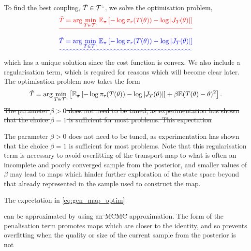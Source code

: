 \documentclass[final]{siamltex}
\newcommand{\edit}[1]{{\color{red} #1}}  %
\newcommand{\ltri}{%
\,\resizebox{!}{0.25\baselineskip}{%
\begin{tikzpicture}%
\draw[line width=1mm](0,0) -- (0,2) -- (2,0)  -- (0,0);
\end{tikzpicture}%
}\xspace%
}%
\newcommand{\smallltri}{%
\,\resizebox{!}{0.15\baselineskip}{%
\begin{tikzpicture}%
\draw[line width=1mm](0,0) -- (0,2) -- (2,0)  -- (0,0);
\end{tikzpicture}%
}\xspace%
}%
\providecommand{\DIFadd}[1]{{\protect\color{blue}\uwave{#1}}} %
\providecommand{\DIFdel}[1]{{\protect\color{red}\sout{#1}}}                      %
\providecommand{\DIFaddbegin}{} %
\providecommand{\DIFaddend}{} %
\providecommand{\DIFdelbegin}{} %
\providecommand{\DIFdelend}{} %
\newcommand{\DIFscaledelfig}{0.5}
\newlength{\DIFdelgraphicswidth} %
\newlength{\DIFdelgraphicsheight} %
\newcommand{\DIFaddincludegraphics}[2][]{{\color{blue}\fbox{\DIFOincludegraphics[#1]{#2}}}} %
\newcommand{\DIFdelincludegraphics}[2][]{%
\sbox{\DIFdelgraphicsbox}{\DIFOincludegraphics[#1]{#2}}%
\settoboxwidth{\DIFdelgraphicswidth}{\DIFdelgraphicsbox} %
\settoboxtotalheight{\DIFdelgraphicsheight}{\DIFdelgraphicsbox} %
\scalebox{\DIFscaledelfig}{%
\parbox[b]{\DIFdelgraphicswidth}{\usebox{\DIFdelgraphicsbox}\\[-\baselineskip] \rule{\DIFdelgraphicswidth}{0em}}\llap{\resizebox{\DIFdelgraphicswidth}{\DIFdelgraphicsheight}{%
\setlength{\unitlength}{\DIFdelgraphicswidth}%
\begin{picture}(1,1)%
\thicklines\linethickness{2pt} %
{\color[rgb]{1,0,0}\put(0,0){\framebox(1,1){}}}%
{\color[rgb]{1,0,0}\put(0,0){\line( 1,1){1}}}%
{\color[rgb]{1,0,0}\put(0,1){\line(1,-1){1}}}%
\end{picture}%
}\hspace*{3pt}}} %
} %
\DeclareRobustCommand{\DIFaddbegin}{\DIFOaddbegin \let\includegraphics\DIFaddincludegraphics} %
\DeclareRobustCommand{\DIFaddend}{\DIFOaddend \let\includegraphics\DIFOincludegraphics} %
\DeclareRobustCommand{\DIFdelbegin}{\DIFOdelbegin \let\includegraphics\DIFdelincludegraphics} %
\DeclareRobustCommand{\DIFdelend}{\DIFOaddend \let\includegraphics\DIFOincludegraphics} %
\begin{document}
To find the best coupling, $\tilde{T} \in \mathcal{T}^{\ltri}$, we solve the optimisation problem,
\DIFdelbegin \[
	\DIFdel{\tilde{T} = \arg\min_{T \in \mathcal{T}^{\smallltri}} \mathbb{E}_\pi\left[-\log\pi_r(T(\theta)) -
		\log\left|J_T(\theta)\right|\right]
}\]
\DIFdelend \DIFaddbegin \begin{equation}
	\DIFadd{\tilde{T} = \arg\min_{T \in \mathcal{T}^{\smallltri}} \mathbb{E}_\pi\left[-\log\pi_r(T(\theta)) -
		\log\left|J_T(\theta)\right|\right]
}\end{equation}
\DIFaddend which has a unique solution since the cost function is convex. We also include a regularisation term, which is required for reasons which will become clear later. The optimisation problem now takes the form
\begin{equation}\label{eq:gen_map_optim}
	\tilde{T} = \arg\min_{T\in\mathcal{T}^{\smallltri}} \left[
		 \mathbb{E}_\pi\left[-\log\pi_r(T(\theta)) -
		\log\left|J_T(\theta)\right|\right] + \beta\mathbb{E}(T(\theta)- \theta)^2 \right].
\end{equation}
\DIFdelbegin \DIFdel{The parameter $\beta>0$ does not need to be tuned, as experimentation has shown that the choice
$\beta=1$ is sufficient for most problems. This expectation }\DIFdelend \DIFaddbegin \edit{The parameter $\beta>0$ does not need to be tuned, as experimentation has shown that the choice
$\beta=1$ is sufficient for most problems. Note that this
regularisation term is necessary to avoid overfitting of the transport
map to what is often an incomplete and poorly converged sample from
the posterior, and smaller values of $\beta$ may lead to maps which
hinder further exploration of the state space beyond that already
represented in the sample used to construct the map.

The expectation in \eqref{eq:gen_map_optim}} \DIFaddend can be
approximated by using \DIFdelbegin \DIFdel{an MCMC }\DIFdelend \DIFaddbegin \DIFadd{a Monte Carlo }\DIFaddend approximation. The form of the penalisation term promotes maps which are
closer to the identity, and so prevents overfitting when the quality
or size of the current sample from the posterior is not
\end{document}
